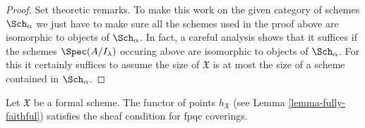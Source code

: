 \begin{proof}
\medskip\noindent
Set theoretic remarks. To make this work on the given category
of schemes $\Sch_\alpha$ we just have to make sure all the
schemes used in the proof above are isomorphic to objects of $\Sch_\alpha$.
In fact, a careful analysis shows that it suffices if the
schemes $\Spec(A/I_\lambda)$ occuring above are isomorphic to
objects of $\Sch_\alpha$. For this it certainly suffices to assume
the size of $\mathfrak X$ is at most the size of
a scheme contained in $\Sch_\alpha$.
\end{proof}

\begin{lemma}
\label{lemma-formal-scheme-sheaf-fppf}
Let $\mathfrak X$ be a formal scheme. The functor of points
$h_\mathfrak X$ (see Lemma \ref{lemma-fully-faithful})
satisfies the sheaf condition for fpqc coverings.
\end{lemma}

